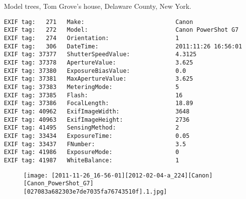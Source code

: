\section{\protect{}}
\noindent Model trees, Tom Grove's house, Delaware County, New York.
\noindent
\begin{lstlisting}
EXIF tag:   271   Make:                          Canon
EXIF tag:   272   Model:                         Canon PowerShot G7
EXIF tag:   274   Orientation:                   1
EXIF tag:   306   DateTime:                      2011:11:26 16:56:01
EXIF tag: 37377   ShutterSpeedValue:             4.3125
EXIF tag: 37378   ApertureValue:                 3.625
EXIF tag: 37380   ExposureBiasValue:             0.0
EXIF tag: 37381   MaxApertureValue:              3.625
EXIF tag: 37383   MeteringMode:                  5
EXIF tag: 37385   Flash:                         16
EXIF tag: 37386   FocalLength:                   18.89
EXIF tag: 40962   ExifImageWidth:                3648
EXIF tag: 40963   ExifImageHeight:               2736
EXIF tag: 41495   SensingMethod:                 2
EXIF tag: 33434   ExposureTime:                  0.05
EXIF tag: 33437   FNumber:                       3.5
EXIF tag: 41986   ExposureMode:                  0
EXIF tag: 41987   WhiteBalance:                  1

\end{lstlisting}
\clearpage
\begin{figure}
\raggedleft
\texttt{[image: [2011-11-26\_16-56-01][2012-02-04-a\_224][Canon][Canon\_PowerShot\_G7][027083a682303e7de7035fa76743510f].1.jpg]}
\end{figure}


\clearpage
